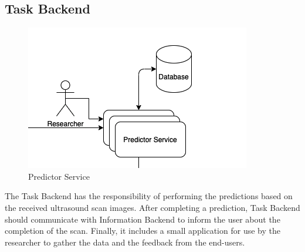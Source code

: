 		\subsection{Task Backend}
			\begin{figure}[H]
				\iftrue
				\caption{Predictor Service}
				\centering
				\includegraphics[scale=0.5]{figures/taskbe}
				\fi
			\end{figure}
			The Task Backend has the responsibility of performing the predictions based on the received ultrasound scan images. 
			After completing a prediction, Task Backend should communicate with Information Backend to inform the user about the 
			completion of the scan. Finally, it includes a small application for use by the researcher to gather the data and the 
			feedback from the end-users.
	
		
				
					
			
		
	
